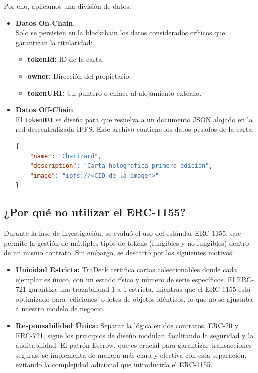 Por ello, aplicamos una división de datos:
\begin{itemize}
    \item \textbf{Datos On-Chain}. \\ Solo se persisten en la blockchain los datos considerados críticos 
    que garantizan la titularidad:
    \begin{itemize}
        \item \textbf{tokenId:} ID de la carta. 
        \item \textbf{owner:} Dirección del propietario.
        \item \textbf{tokenURI:} Un puntero o enlace al alojamiento externo.
    \end{itemize}

    \item \textbf{Datos Off-Chain}. \\ El \texttt{tokenURI} se diseña para que resuelva a un documento JSON alojado en la 
    red descentralizada IPFS. Este archivo contiene los datos pesados de la carta: 

    \begin{lstlisting}[language=json, caption=Ejemplo de tokenURI apuntando a IPFS]
{
    "name": "Charizard",
    "description": "Carta holografica primera edicion",
    "image": "ipfs://<CID-de-la-imagen>"
}
    \end{lstlisting}

\end{itemize}

\subsection{¿Por qué no utilizar el ERC-1155?}
Durante la fase de investigación, se evaluó el uso del estándar ERC-1155, que permite la gestión de mútliples tipos de 
tokens (fungibles y no fungibles) dentro de un mismo contrato. Sin embargo, se descartó por los siguientes motivos:

\begin{itemize}
    \item \textbf{Unicidad Estricta:} TraDeck certifica cartas coleccionables donde cada ejemplar es único, con un 
    estado físico y número de serie específicos. El ERC-721 garantiza una trazabilidad 1 a 1 estricta, mientras que 
    el ERC-1155 está optimizado para 'ediciones' o lotes de objetos idénticos, lo que no se ajustaba a nuestro modelo de negocio. 

    \item \textbf{Responsabilidad Única:} Separar la lógica en dos contratos, ERC-20 y ERC-721, sigue los principios 
    de diseño modular, facilitando la seguridad y la auditabilidad. El patrón Escrow, que es crucial para garantizar
    transacciones seguras, se implementa de manera más clara y efectiva con esta separación, evitando la complejidad 
    adicional que introduciría el ERC-1155.
\end{itemize}

